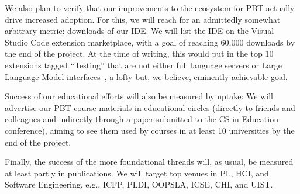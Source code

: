 We also plan to verify that our improvements to the ecosystem for PBT
actually drive increased adoption. For this, we will reach for an
admittedly somewhat arbitrary metric: downloads of our \tyche{} IDE.
We will list the IDE on the Visual Studio Code extension marketplace,
with a goal of reaching 60,000 downloads by the end of the project. At
the time of writing, this would put \tyche{} in the top 10 extensions
tagged ``Testing'' that are not either full language servers or Large
Language Model interfaces~\cite{noauthor_testing_nodate}, a lofty but,
we believe, eminently achievable goal.

Success of our educational efforts will also be measured by uptake: We
will advertise our PBT course materials in educational circles
(directly to friends and colleagues and indirectly through a paper
submitted to the CS in Education conference), aiming to see them used
by courses in at least 10 universities by the end of the project.


Finally, the
success of the more foundational threads will, as usual, be measured
at least partly in publications.  We will target top venues in PL,
HCI, and Software Engineering, e.g., ICFP, PLDI, OOPSLA, ICSE, CHI,
and UIST.  


\clearpage
